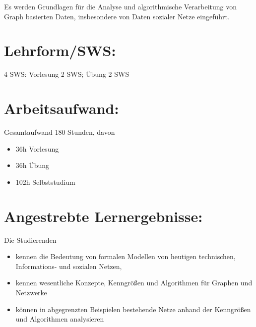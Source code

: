 Es werden Grundlagen für die Analyse und algorithmische Verarbeitung von
Graph basierten Daten, insbesondere von Daten sozialer Netze eingeführt.

\section*{Lehrform/SWS:\label{/mi-2017/modulbeschreibungen-master/MA_SC_Modul_Netzwerk--und-Graphentheorie}}\label{lehrformswspathlabelmi-2017modulbeschreibungen-mastermaux5fscux5fmodulux5fnetzwerkund-graphentheorie}

4 SWS: Vorlesung 2 SWS; Übung 2 SWS

\section*{Arbeitsaufwand:\label{/mi-2017/modulbeschreibungen-master/MA_SC_Modul_Netzwerk--und-Graphentheorie}}\label{arbeitsaufwandpathlabelmi-2017modulbeschreibungen-mastermaux5fscux5fmodulux5fnetzwerkund-graphentheorie}

Gesamtaufwand 180 Stunden, davon

\begin{itemize}
\tightlist
\item
  36h Vorlesung
\item
  36h Übung
\item
  102h Selbststudium
\end{itemize}

\section*{Angestrebte
Lernergebnisse:\label{/mi-2017/modulbeschreibungen-master/MA_SC_Modul_Netzwerk--und-Graphentheorie}}\label{angestrebte-lernergebnissepathlabelmi-2017modulbeschreibungen-mastermaux5fscux5fmodulux5fnetzwerkund-graphentheorie}

Die Studierenden

\begin{itemize}
\tightlist
\item
  kennen die Bedeutung von formalen Modellen von heutigen technischen,
  Informations- und sozialen Netzen,
\item
  kennen wesentliche Konzepte, Kenngrößen und Algorithmen für Graphen
  und Netzwerke
\item
  können in abgegrenzten Beispielen bestehende Netze anhand der
  Kenngrößen und Algorithmen analysieren
\end{itemize}

